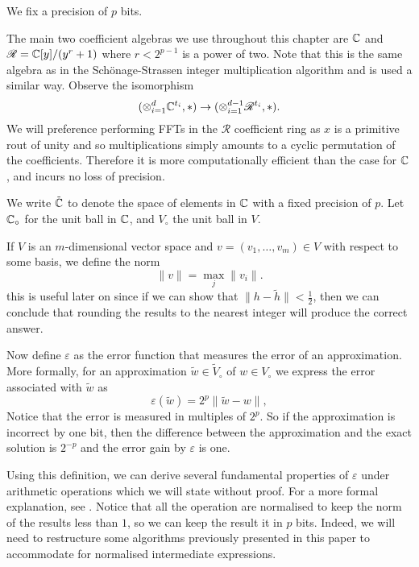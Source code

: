 We fix a precision of $p$ bits.

The main two coefficient algebras we use throughout this chapter are ${\mathbb C}$ and $\mathscr{R} = {\mathbb C}[y]/(y^r + 1)$ where $r < 2^{p-1}$ is a power of two. Note that this is the same algebra as in the Sch\"{o}nage-Strassen integer multiplication algorithm and is used a similar way. Observe the isomorphism
\[
    (\otimes^d_{i=1}{\mathbb C}^{t_i}, \ast) \to (\otimes_{i=1}^{d-1} \mathscr{R}^{t_i}, \ast).
\]
We will preference performing FFTs in the $\mathscr{R}$ coefficient ring as $x$ is a primitive rout of unity and so multiplications simply amounts to a cyclic permutation of the coefficients. Therefore it is more computationally efficient than the case for ${\mathbb C}$, and incurs no loss of precision.

We write $\tilde{{\mathbb C}}$ to denote the space of elements in ${\mathbb C}$ with a fixed precision of $p$. Let ${\mathbb C}_\circ$ for the unit ball in ${\mathbb C}$, and $V_\circ$ the unit ball in $V$.

If $V$ is an $m$-dimensional vector space and $v = (v_1, \ldots, v_m) \in V$ with respect to some basis, we define the norm
\[
    \|v\| = \max_j \|v_i\|.
\]
this is useful later on since if we can show that $\|h - \tilde{h}\| < \frac{1}{2}$, then we can conclude that rounding the results to the nearest integer will produce the correct answer.

Now define $\varepsilon$ as the error function that measures the error of an approximation. More formally, for an approximation $\tilde{w} \in \tilde{V}_\circ$ of $w \in V_\circ$ we express the error associated with $\tilde{w}$ as
\[
    \varepsilon(\tilde{w}) = 2^p \|\tilde{w} - w\|,
\]
Notice that the error is measured in multiples of $2^p$. So if the approximation is incorrect by one bit, then the difference between the approximation and the exact solution is $2^{-p}$ and the error gain by $\varepsilon$ is one.

Using this definition, we can derive several fundamental properties of $\varepsilon$ under arithmetic operations which we will state without proof. For a more formal explanation, see \cite{nlogn}. Notice that all the operation are normalised to keep the norm of the results less than $1$, so we can keep the result it in $p$ bits. Indeed, we will need to restructure some algorithms previously presented in this paper to accommodate for normalised intermediate expressions.

